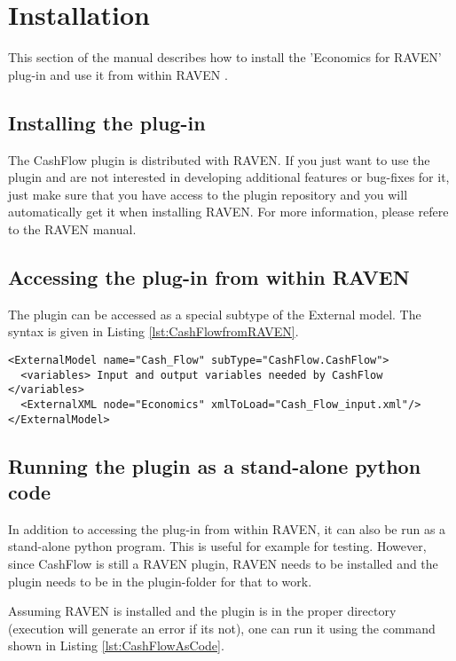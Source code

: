 
\section{Installation}
\label{sec:Installation}

This section of the manual describes how to install the 'Economics for RAVEN'  plug-in and use it from within RAVEN \cite{RAVEN}.

\subsection{Installing the plug-in}
The CashFlow plugin is distributed with RAVEN. If you just want to use the plugin and are not interested in developing additional features or bug-fixes for it, just make sure that you have access to the plugin repository and you will automatically get it when installing RAVEN.
For more information, please refere to the RAVEN manual.

\subsection{Accessing the plug-in from within RAVEN}
The plugin can be accessed as a special subtype of the External model. The syntax is given in Listing \ref{lst:CashFlowfromRAVEN}.

\begin{lstlisting}[style=XML,morekeywords={anAttribute},caption=Call CashFlow from RAVEN input., label=lst:CashFlowfromRAVEN]
<ExternalModel name="Cash_Flow" subType="CashFlow.CashFlow">
  <variables> Input and output variables needed by CashFlow  </variables>
  <ExternalXML node="Economics" xmlToLoad="Cash_Flow_input.xml"/>
</ExternalModel>
\end{lstlisting}

\subsection{Running the plugin as a stand-alone python code}

In addition to accessing the plug-in from within RAVEN, it can also be run as a stand-alone python program. This is useful for example for testing. However, since CashFlow is still a RAVEN plugin, RAVEN needs to be installed and the plugin needs to be in the plugin-folder for that to work.

Assuming RAVEN is installed and the plugin is in the proper directory (execution will generate an error if its not), one can run it using the command shown in Listing \ref{lst:CashFlowAsCode}.

